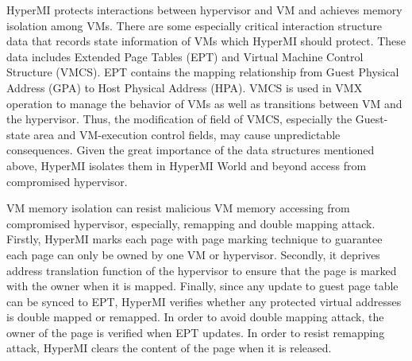 \documentclass[conference]{IEEEtran}
\begin{document}
HyperMI protects interactions between hypervisor and VM and achieves memory isolation among VMs. 
There are some especially critical interaction structure data that records state information of VMs which HyperMI should protect. These data includes Extended Page Tables (EPT) and Virtual Machine Control Structure (VMCS). EPT contains the mapping relationship from Guest Physical Address (GPA) to Host Physical Address (HPA). 
VMCS is used in VMX operation to manage the behavior of VMs as well as transitions between VM and the hypervisor. Thus, the modification of field of VMCS, especially the Guest-state area and VM-execution control fields, may cause unpredictable consequences. %
Given the great importance of the data structures mentioned above, HyperMI isolates them in HyperMI World and beyond access from compromised hypervisor.

VM memory isolation can resist malicious VM memory accessing from compromised hypervisor, especially, remapping and double mapping attack.
Firstly, HyperMI marks each page with page marking technique to guarantee each page can only be owned by one VM or hypervisor.
Secondly, it deprives address translation function of the hypervisor to ensure that the page is marked with the owner when it is mapped. 
Finally, since any update to guest page table can be synced to EPT, HyperMI verifies whether any protected virtual addresses is double mapped or remapped.
In order to avoid double mapping attack, the owner of the page is verified when EPT updates.
In order to resist remapping attack, HyperMI clears the content of the page when it is released.
\end{document}
